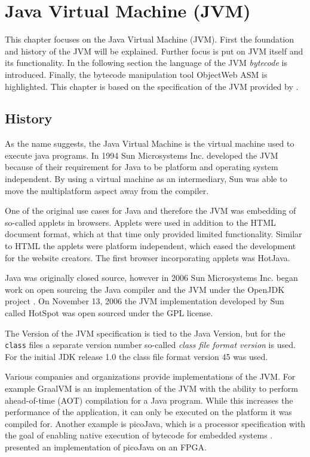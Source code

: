 \chapter{Java Virtual Machine (JVM)}

This chapter focuses on the Java Virtual Machine (JVM). First the foundation and history of the JVM will be explained. Further focus is put on JVM itself and its functionality. In the following section the language of the JVM \textit{bytecode} is introduced. Finally, the bytecode manipulation tool ObjectWeb ASM is highlighted. This chapter is based on the specification of the JVM provided by \textcite{JVMHistoryOracle}.

\section{History}

 As the name suggests, the Java Virtual Machine is the virtual machine used to execute java programs. In 1994 Sun Microsystems Inc. developed the JVM because of their requirement for Java to be platform and operating system independent. By using a virtual machine as an intermediary, Sun was able to move the multiplatform aspect away from the compiler. 

One of the original use cases for Java and therefore the JVM was embedding of so-called applets in browsers. Applets were used in addition to the HTML document format, which at that time only provided limited functionality. Similar to HTML the applets were platform independent, which eased the development for the website creators. The first browser incorporating applets was HotJava. 

Java was originally closed source, however in 2006 Sun Microsystems Inc. began work on open sourcing the Java compiler and the JVM under the OpenJDK project \parencite{SunOpenSourceJava}. On November 13, 2006 the JVM implementation developed by Sun called HotSpot was open sourced under the GPL license.

The Version of the JVM specification is tied to the Java Version, but for the \texttt{class} files a separate version number so-called \textit{class file format version} is used. For the initial JDK release 1.0 the class file format version 45 was used. 

Various companies and organizations provide implementations of the JVM. For example GraalVM is an implementation of the JVM with the ability to perform ahead-of-time (AOT) compilation for a Java program. While this increases the performance of the application, it can only be executed on the platform it was compiled for. Another example is picoJava, which is a processor specification with the goal of enabling native execution of bytecode for embedded systems \parencite{PicoJava}. \textcite{PicoJavaFPGA} presented an implementation of picoJava on an FPGA.

